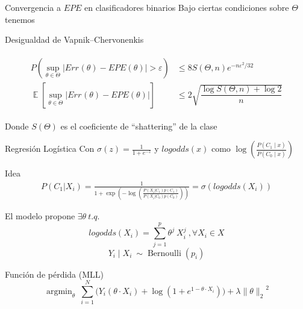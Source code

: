 \documentclass[xcolor=x11names]{beamer}
\DeclareMathOperator{\Expect}{\mathbb{E}}
\DeclareMathOperator{\trainsetn}{\mathcal{T}^{(n)}}
\begin{document}

\begin{frame}{Convergencia a $EPE$ en clasificadores binarios}
Bajo ciertas condiciones sobre $\Theta$ tenemos
	\begin{block}{Desigualdad de Vapnik–Chervonenkis}

		\begin{align*}
			\begin{split}
				P\left(\sup_{\theta\in \Theta}\left|Err_{\trainsetn}(\theta)-EPE (\theta)\right|>\varepsilon \right) & \leq
				8S (\Theta,n) e^{{-n \varepsilon^{2}/32}}\\
				\Expect\left[\sup_{\theta \in \Theta}\left| Err_{\trainsetn}(\theta)-EPE (\theta)\right|\right] &
				\leq 2\sqrt{\dfrac{\log S(\Theta,n)+\log2}{n}}
			\end{split}
		\end{align*}

	\end{block}

	Donde $S(\Theta)$ es el coeficiente de ``shattering'' de la clase
\end{frame}


\begin{frame}[shrink=5]{Regresión Logística}
Con $\sigma(z) = \frac{1}{1 + e^{-z}}$ y $logodds(x)$ como $\log \left(  \frac{ P(C_1 \mid x)}{P(C_0 \mid x ) } \right)$
	\begin{block}{Idea}
	\footnotesize
	\begin{align*}
		P(C_1| X_i)  = \frac{1}{1 + \exp \left(- \log \left(  \frac{ P(X_i|C_1)p(C_1)}{P(X_i|C_0)p(C_0)} \right) \right)} = \sigma\left(logodds(X_i)\right)
	\end{align*}

	El modelo propone $\exists \theta \ t.q.$
	$$logodds(X_i) = \sum_{j=1}^p \theta^j \ X_i^j  \ , \forall X_i \in X $$
	$$Y_i \mid X_i \ \sim \operatorname{Bernoulli}(p_i)$$

	\end{block}

	\begin{block}{Función de pérdida (MLL)}
		$$\operatorname{argmin}_{\theta} \ \sum_{i=1}^N \big(Y_i ( \theta \cdot X_i ) + \log(1 + e^{1- \theta \cdot X_i} ) \big) + \lambda { \| \theta \|_{2}}^2$$
	\end{block}
\end{frame}
\end{document}
